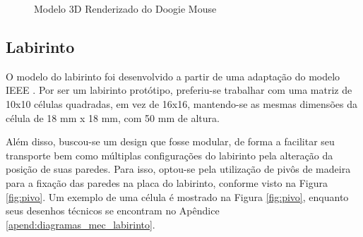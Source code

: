 \begin{figure}[H]
	\centering
	\caption{Modelo 3D Renderizado do Doogie Mouse}
	\label{fig:doogie_boards_3d_render}
\end{figure}

\subsection{Labirinto}
\label{ssec:labirinto}

O modelo do labirinto foi desenvolvido a partir de uma adaptação do modelo IEEE \cite{Wan2019}. Por ser um labirinto protótipo, preferiu-se trabalhar com uma matriz de 10x10 células quadradas, em vez de 16x16, mantendo-se as mesmas dimensões da célula de 18 mm x 18 mm, com 50 mm de altura.

Além disso, buscou-se um design que fosse modular, de forma a facilitar seu transporte bem como múltiplas configurações do labirinto pela alteração da posição de suas paredes. Para isso, optou-se pela utilização de pivôs de madeira para a fixação das paredes na placa do labirinto, conforme visto na Figura \ref{fig:pivo}. Um exemplo de uma célula é mostrado na Figura \ref{fig:pivo}, enquanto seus desenhos técnicos se encontram no Apêndice \ref{apend:diagramas_mec_labirinto}.

